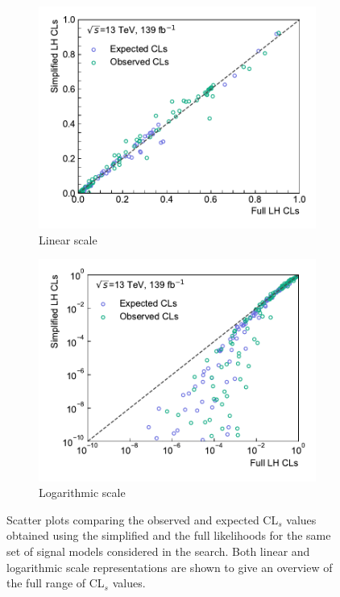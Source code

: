 \begin{figure}
	\centering
	\begin{subfigure}[b]{0.5\textwidth}
		\centering\includegraphics[width=\textwidth]{cls_scatter_1Lbb_lin}
		\caption{Linear scale}
	\end{subfigure}\hfill
	\begin{subfigure}[b]{0.5\textwidth}
		\centering\includegraphics[width=\textwidth]{cls_scatter_1Lbb_log}
		\caption{Logarithmic scale}
	\end{subfigure}
	\caption{Scatter plots comparing the observed and expected CL$_s$ values obtained using the simplified and the full likelihoods for the same set of signal models considered in the \onelepton search. Both linear and logarithmic scale representations are shown to give an overview of the full range of CL$_s$ values.}\label{fig:scatter_cls}
\end{figure}


